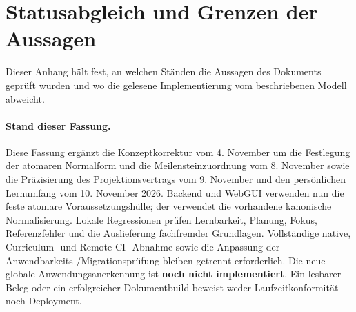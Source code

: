 \appendix

\section{Statusabgleich und Grenzen der Aussagen}
\label{sec:implementation}
Dieser Anhang hält fest, an welchen Ständen die Aussagen des Dokuments
geprüft wurden und wo die gelesene Implementierung vom beschriebenen Modell
abweicht.

\paragraph{Stand dieser Fassung.}
Diese Fassung ergänzt die Konzeptkorrektur vom 4. November um die
Festlegung der atomaren Normalform und die Meilensteinzuordnung vom
8. November sowie die Präzisierung des Projektionsvertrags vom
9. November und den persönlichen Lernumfang vom 10. November 2026.
Backend und WebGUI verwenden nun die feste atomare Voraussetzungshülle;
der 
verwendet die vorhandene kanonische Normalisierung. Lokale Regressionen
prüfen Lernbarkeit, Planung, Fokus, Referenzfehler und die Auslieferung
fachfremder Grundlagen. Vollständige native, Curriculum- und Remote-CI-
Abnahme sowie die Anpassung der Anwendbarkeits-/Migrationsprüfung bleiben
getrennt erforderlich. Die neue globale Anwendungsanerkennung
ist \textbf{noch nicht implementiert}. Ein lesbarer Beleg oder ein
erfolgreicher Dokumentbuild beweist weder Laufzeitkonformität noch Deployment.

